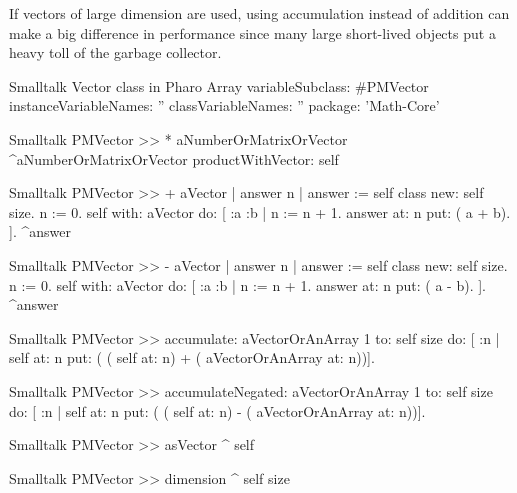 If vectors of large dimension are used, using accumulation instead
of addition can make a big difference in performance since many
large short-lived objects put a heavy toll of the garbage
collector.

\begin{listing}[label=lst:vector]{Smalltalk}
{Vector class in Pharo}
Array variableSubclass: #PMVector
   instanceVariableNames: ''
   classVariableNames: ''
   package: 'Math-Core'
\end{listing}

\begin{displaycode}{Smalltalk}
PMVector >> * aNumberOrMatrixOrVector
    ^aNumberOrMatrixOrVector productWithVector: self
\end{displaycode}

\begin{displaycode}{Smalltalk}
PMVector >> + aVector
    | answer n |
    answer := self class new: self size.
    n := 0.
    self with: aVector do:
        [ :a :b | 
          n := n + 1. 
          answer at: n put: ( a + b).
        ].
    ^answer
\end{displaycode}

\begin{displaycode}{Smalltalk}
PMVector >> - aVector
    | answer n |
    answer := self class new: self size.
    n := 0.
    self with: aVector do:
        [ :a :b | 
          n := n + 1. 
          answer at: n put: ( a - b).
        ].
    ^answer
\end{displaycode}

\begin{displaycode}{Smalltalk}
PMVector >> accumulate: aVectorOrAnArray
    1 to: self size do: [ :n | self at: n put: ( ( self at: n) + ( 
                                            aVectorOrAnArray at: n))].
\end{displaycode}

\begin{displaycode}{Smalltalk}
PMVector >> accumulateNegated: aVectorOrAnArray
    1 to: self size do: [ :n | self at: n put: ( ( self at: n) - ( 
                                            aVectorOrAnArray at: n))].
\end{displaycode}

\begin{displaycode}{Smalltalk}
PMVector >> asVector
    ^ self
\end{displaycode}

\begin{displaycode}{Smalltalk}
PMVector >> dimension
    ^ self size
\end{displaycode}

